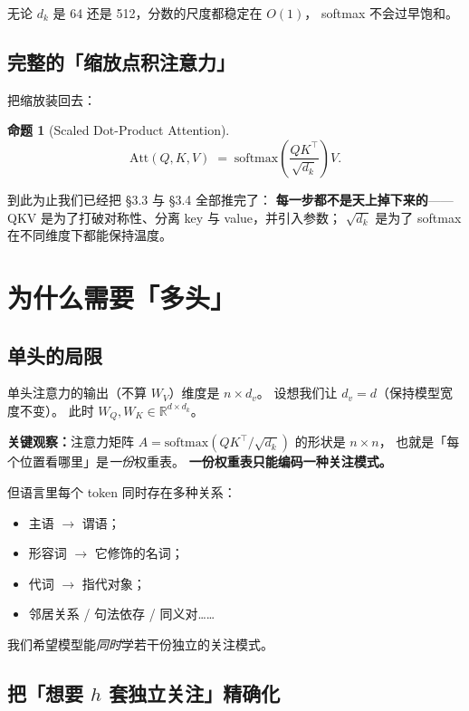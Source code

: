 \documentclass[11pt,a4paper]{ctexart}
\theoremstyle{definition}
\newtheorem{theorem}{命题}
\theoremstyle{remark}
\newcommand{\R}{\mathbb{R}}
\newcommand{\softmax}{\mathrm{softmax}}
\newcommand{\Att}{\mathrm{Att}}
\begin{document}
无论 $d_k$ 是 64 还是 512，分数的尺度都稳定在 $O(1)$，
softmax 不会过早饱和。

\subsection{完整的「缩放点积注意力」}

把缩放装回去：

\begin{theorem}[Scaled Dot-Product Attention]
\[
  \boxed{\;\Att(Q, K, V) \;=\; \softmax\!\left(\frac{QK^\top}{\sqrt{d_k}}\right) V.\;}
\]
\end{theorem}

\begin{keypoint}
到此为止我们已经把 §3.3 与 §3.4 全部推完了：
\textbf{每一步都不是天上掉下来的}——
QKV 是为了打破对称性、分离 key 与 value，并引入参数；
$\sqrt{d_k}$ 是为了 softmax 在不同维度下都能保持温度。
\end{keypoint}

\section{为什么需要「多头」}

\subsection{单头的局限}

单头注意力的输出（不算 $W_V$）维度是 $n \times d_v$。
设想我们让 $d_v = d$（保持模型宽度不变）。
此时 $W_Q, W_K \in \R^{d \times d_k}$。

\textbf{关键观察：}注意力矩阵 $A = \softmax(QK^\top/\sqrt{d_k})$ 的形状是 $n \times n$，
也就是「每个位置看哪里」是\emph{一份}权重表。
\textbf{一份权重表只能编码一种关注模式。}

但语言里每个 token 同时存在多种关系：
\begin{itemize}
  \item 主语 $\to$ 谓语；
  \item 形容词 $\to$ 它修饰的名词；
  \item 代词 $\to$ 指代对象；
  \item 邻居关系 / 句法依存 / 同义对……
\end{itemize}

我们希望模型能\emph{同时}学若干份独立的关注模式。

\subsection{把「想要 \texorpdfstring{$h$}{h} 套独立关注」精确化}
\end{document}
